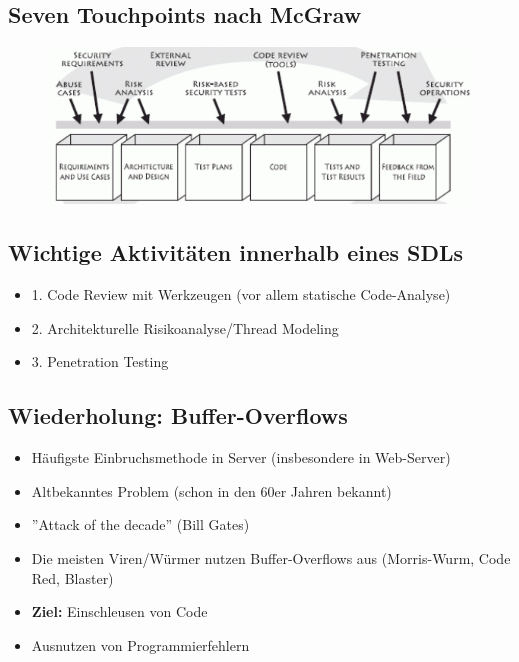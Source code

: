 \documentclass[openany]{book}
\begin{document}
\newpage

\subsection{Seven Touchpoints nach McGraw}

\begin{figure}[h!]
    \centering
    \includegraphics[width=0.85\linewidth]{Pics/McGrawSDL.PNG}
\end{figure}

\subsection{Wichtige Aktivitäten innerhalb eines SDLs}

\begin{itemize}
    \item 1. Code Review mit Werkzeugen (vor allem statische Code-Analyse)
    \item 2. Architekturelle Risikoanalyse/Thread Modeling
    \item 3. Penetration Testing
\end{itemize}

\subsection{Wiederholung: Buffer-Overflows}

\begin{itemize}
    \item Häufigste Einbruchsmethode in Server (insbesondere in Web-Server)
    \item Altbekanntes Problem (schon in den 60er Jahren bekannt)
    \item ''Attack of the decade'' (Bill Gates)
    \item Die meisten Viren/Würmer nutzen Buffer-Overflows aus (Morris-Wurm, Code Red, Blaster)
    \item \textbf{Ziel:} Einschleusen von Code
    \item Ausnutzen von Programmierfehlern
\end{itemize}
\end{document}
